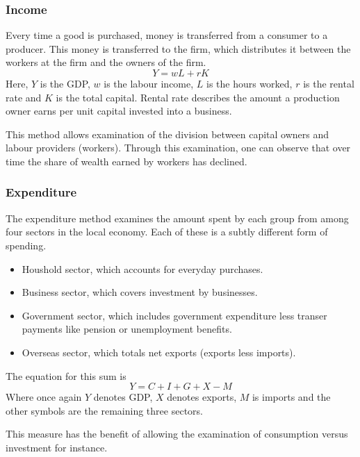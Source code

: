 \documentclass[12pt]{report}
\begin{document}
\begin{flushleft}
\subsubsection*{Income}
Every time a good is purchased, money is transferred from a consumer to a
producer. This money is transferred to the firm, which distributes it between
the workers at the firm and the owners of the firm.
\[Y = wL + rK\]
Here, \(Y\) is the GDP, \(w\) is the labour income, \(L\) is the hours worked,
\(r\) is the rental rate and \(K\) is the total capital. Rental rate describes
the amount a production owner earns per unit capital invested into a business.
\par
This method allows examination of the division between capital owners and 
labour providers (workers). Through this examination, one can observe that over
time the share of wealth earned by workers has declined.

\subsubsection*{Expenditure}
The expenditure method examines the amount spent by each group from among four
sectors in the local economy. Each of these is a subtly different form of 
spending.
\begin{itemize}
    \item Houshold sector, which accounts for everyday purchases.
    \item Business sector, which covers investment by businesses.
    \item Government sector, which includes government expenditure less transer
        payments like pension or unemployment benefits.
    \item Overseas sector, which totals net exports (exports less imports).
\end{itemize}
The equation for this sum is
\[Y = C + I + G + X - M\]
Where once again \(Y\) denotes GDP, \(X\) denotes exports, \(M\) is imports and
the other symbols are the remaining three sectors. \par
This measure has the benefit of allowing the examination of consumption versus
investment for instance.


\end{flushleft}
\end{document}
